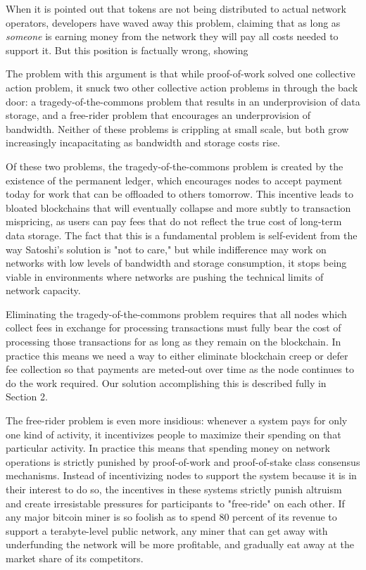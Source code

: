 \documentclass[11.5pt, oneside]{article}   	%
\begin{document}
\begin{multicols}{2}
When it is pointed out that tokens are not being distributed to actual network operators, developers have waved away this problem, claiming that as long as {\textit{someone}} is earning money from the network they will pay all costs needed to support it. But this position is factually wrong, showing 

The problem with this argument is that while proof-of-work solved one collective action problem, it snuck two other collective action problems in through the back door: a tragedy-of-the-commons problem that results in an underprovision of data storage, and a free-rider problem that encourages an underprovision of bandwidth. Neither of these problems is crippling at small scale, but both grow increasingly incapacitating as bandwidth and storage costs rise.

Of these two problems, the tragedy-of-the-commons problem is created by the existence of the permanent ledger, which encourages nodes to accept payment today for work that can be offloaded to others tomorrow. This incentive leads to bloated blockchains that will eventually collapse and more subtly to transaction mispricing, as users can pay fees that do not reflect the true cost of long-term data storage. The fact that this is a fundamental problem is self-evident from the way Satoshi's solution is "not to care," but while indifference may work on networks with low levels of bandwidth and storage consumption, it stops being viable in environments where networks are pushing the technical limits of network capacity.

Eliminating the tragedy-of-the-commons problem requires that all nodes which collect fees in exchange for processing transactions must fully bear the cost of processing those transactions for as long as they remain on the blockchain. In practice this means we need a way to either eliminate blockchain creep or defer fee collection so that payments are meted-out over time as the node continues to do the work required. Our solution accomplishing this is described fully in Section 2.

The free-rider problem is even more insidious: whenever a system pays for only one kind of activity, it incentivizes people to maximize their spending on that particular activity. In practice this means that spending money on network operations is strictly punished by proof-of-work and proof-of-stake class consensus mechanisms. Instead of incentivizing nodes to support the system because it is in their interest to do so, the incentives in these systems strictly punish altruism and create irresistable pressures for participants to "free-ride" on each other. If any major bitcoin miner is so foolish as to spend 80 percent of its revenue to support a terabyte-level public network, any miner that can get away with underfunding the network will be more profitable, and gradually eat away at the market share of its competitors.


\end{multicols}
\end{document}
